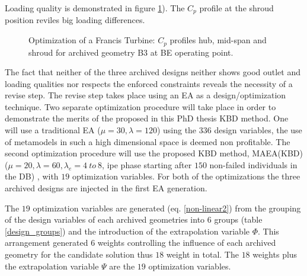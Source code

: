 Loading quality is demonstrated in figure \ref{Francis-B3-LOAD}). The $C_p$ profile at the shroud position reviles big loading differences. 

\begin{figure}[h!]
\begin{minipage}[b]{1\linewidth}
 \centering
\end{minipage}
\caption{Optimization of a Francis Turbine: $C_p$ profiles hub, mid-span and shroud for archived geometry B3 at BE operating point.}
\label{Francis-B3-LOAD}
\end{figure}

The fact that neither of the three archived designs neither shows good outlet and loading qualities nor respects the enforced constraints reveals the necessity of a revise step. The revise step takes place using an EA as a design/optimization technique. Two separate optimization procedure will take place in order to demonstrate the merits of the proposed in this PhD thesis KBD method. One will use a traditional EA ($\mu=30,\lambda=120$) using the $336$ design variables, the use of metamodels in such a high dimensional space is deemed non profitable. The second optimization procedure will use the proposed KBD method, MAEA(KBD) ($\mu=20,\lambda=60,\lambda_e= 4 ~ to~ 8$, ipe phase starting after $150$ non-failed individuals in the DB) , with $19$ optimization variables. For both of the optimizations the three archived designs are injected in the first EA generation.

The $19$ optimization variables are generated (eq. \ref{non-linear2}) from the grouping of the design variables of each archived geometries into $6$ groups (table \ref{design_groups}) and the introduction of the extrapolation variable $\Phi$. This arrangement generated $6$ weights controlling the influence of each archived geometry for the candidate solution thus $18$ weight in total. The $18$ weights plus the extrapolation variable $\Psi$ are the $19$ optimization variables.         


